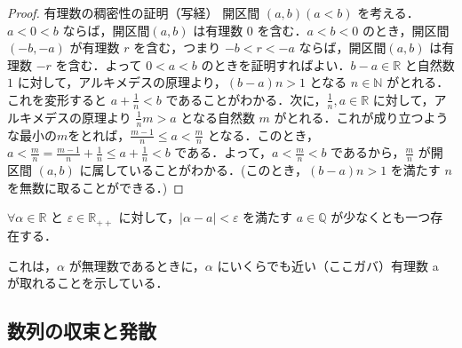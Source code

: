 \documentclass[a4paper]{ltjsarticle}
\begin{document}
  \begin{proof}{有理数の稠密性の証明（写経）}{}
   開区間 $(a, b) (a < b)$ を考える．$a < 0 < b$ ならば，開区間$(a, b)$ は有理数 $0$ を含む．$a < b < 0$ のとき，開区間 $(-b, -a)$ が有理数 $r$ を含む，つまり $-b < r < -a$ ならば，開区間$(a, b)$ は有理数 $-r$ を含む．よって $0 < a < b$ のときを証明すればよい．$b - a \in \mathbb{R}$ と自然数 $1$ に対して，アルキメデスの原理より，$(b - a)n > 1$ となる $n \in \mathbb{N}$ がとれる．これを変形すると $a + \frac{1}{n} < b$ であることがわかる．次に，$\frac{1}{n}, a \in \mathbb{R}$ に対して，アルキメデスの原理より $\frac{1}{n}m > a$ となる自然数 $m$ がとれる．これが成り立つような最小の$m$をとれば，$\frac{m - 1}{n} \leq a < \frac{m}{n}$ となる．このとき，$a < \frac{m}{n} = \frac{m - 1}{n} + \frac{1}{n} \leq a + \frac{1}{n} < b$ である．よって，$a < \frac{m}{n} < b$ であるから，$\frac{m}{n}$ が開区間 $(a, b)$ に属していることがわかる．(このとき，$(b-a)n > 1$ を満たす $n $を無数に取ることができる．)

  \end{proof}
   \begin{corollary}{}{}
    $\forall \alpha \in \mathbb{R}$ と $\varepsilon \in \mathbb{R}_{++}$ に対して，$|\alpha - a| < \varepsilon$ を満たす $a \in \mathbb{Q}$ が少なくとも一つ存在する．

   \end{corollary}
 これは，$\alpha$ が無理数であるときに，$\alpha$ にいくらでも近い（ここガバ）有理数 a が取れることを示している．

  \subsection{数列の収束と発散}
\end{document}
